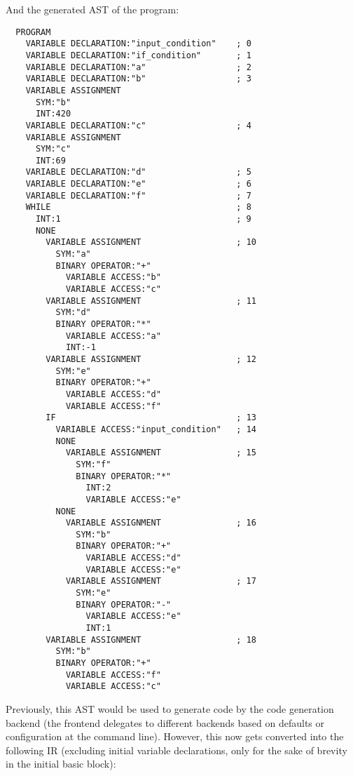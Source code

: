 \documentclass[12pt]{report}
\begin{document}
And the generated AST of the program:
\begin{Verbatim}
  PROGRAM
    VARIABLE DECLARATION:"input_condition"    ; 0
    VARIABLE DECLARATION:"if_condition"       ; 1
    VARIABLE DECLARATION:"a"                  ; 2
    VARIABLE DECLARATION:"b"                  ; 3
    VARIABLE ASSIGNMENT
      SYM:"b"
      INT:420
    VARIABLE DECLARATION:"c"                  ; 4
    VARIABLE ASSIGNMENT
      SYM:"c"
      INT:69
    VARIABLE DECLARATION:"d"                  ; 5
    VARIABLE DECLARATION:"e"                  ; 6
    VARIABLE DECLARATION:"f"                  ; 7
    WHILE                                     ; 8
      INT:1                                   ; 9
      NONE
        VARIABLE ASSIGNMENT                   ; 10
          SYM:"a"
          BINARY OPERATOR:"+"
            VARIABLE ACCESS:"b"
            VARIABLE ACCESS:"c"
        VARIABLE ASSIGNMENT                   ; 11
          SYM:"d"
          BINARY OPERATOR:"*"
            VARIABLE ACCESS:"a"
            INT:-1
        VARIABLE ASSIGNMENT                   ; 12
          SYM:"e"
          BINARY OPERATOR:"+"
            VARIABLE ACCESS:"d"
            VARIABLE ACCESS:"f"
        IF                                    ; 13
          VARIABLE ACCESS:"input_condition"   ; 14
          NONE
            VARIABLE ASSIGNMENT               ; 15
              SYM:"f"
              BINARY OPERATOR:"*"
                INT:2
                VARIABLE ACCESS:"e"
          NONE
            VARIABLE ASSIGNMENT               ; 16
              SYM:"b"
              BINARY OPERATOR:"+"
                VARIABLE ACCESS:"d"
                VARIABLE ACCESS:"e"
            VARIABLE ASSIGNMENT               ; 17
              SYM:"e"
              BINARY OPERATOR:"-"
                VARIABLE ACCESS:"e"
                INT:1
        VARIABLE ASSIGNMENT                   ; 18
          SYM:"b"
          BINARY OPERATOR:"+"
            VARIABLE ACCESS:"f"
            VARIABLE ACCESS:"c"
\end{Verbatim}

Previously, this AST would be used to generate code by the code generation backend (the frontend delegates to different backends based on defaults or configuration at the command line). However, this now gets converted into the following IR (excluding initial variable declarations, only for the sake of brevity in the initial basic block):
\end{document}
